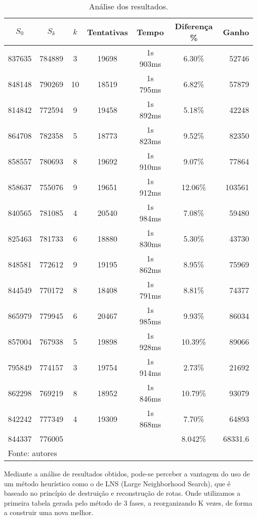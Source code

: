 \documentclass[12pt,a4paper]{article}
\renewcommand*{\arraystretch}{1.2}
\numberwithin{figure}{section}
\numberwithin{table}{section}
\begin{document}
\begin{table}[H]
	\renewcommand{\arraystretch}{1}
	\centering
	\caption{Análise dos resultados.}
	\label{tab:resultados}
	\begin{tabular}{*{6}{c} r}
		\toprule 
		$S_{0}$ & $S_{k}$ & $k$ & Tentativas & Tempo & Diferença \% & Ganho \\ 
		\midrule
		837635 & 784889 &  3 & 19698 & 1s 903ms &  6.30\% &  52746 \\
		848148 & 790269 & 10 & 18519 & 1s 795ms &  6.82\% &  57879 \\
		814842 & 772594 &  9 & 19458 & 1s 892ms &  5.18\% &  42248 \\
		864708 & 782358 &  5 & 18773 & 1s 823ms &  9.52\% &  82350 \\
		858557 & 780693 &  8 & 19692 & 1s 910ms &  9.07\% &  77864 \\
		858637 & 755076 &  9 & 19651 & 1s 912ms & 12.06\% & 103561 \\
		840565 & 781085 &  4 & 20540 & 1s 984ms &  7.08\% &  59480 \\
		825463 & 781733 &  6 & 18880 & 1s 830ms &  5.30\% &  43730 \\
		848581 & 772612 &  9 & 19195 & 1s 862ms &  8.95\% &  75969 \\
		844549 & 770172 &  8 & 18408 & 1s 791ms &  8.81\% &  74377 \\
		865979 & 779945 &  6 & 20467 & 1s 985ms &  9.93\% &  86034 \\
		857004 & 767938 &  5 & 19898 & 1s 928ms & 10.39\% &  89066 \\
		795849 & 774157 &  3 & 19754 & 1s 914ms &  2.73\% &  21692 \\
		862298 & 769219 &  8 & 18952 & 1s 846ms & 10.79\% &  93079 \\
		842242 & 777349 &  4 & 19309 & 1s 868ms &  7.70\% &  64893 \\
		\midrule
		844337 & 776005 &    &       &          &  8.042\% &  68331.6 \\
		\bottomrule
		\multicolumn{6}{l}{\footnotesize Fonte: autores}
	\end{tabular}
\end{table}

Mediante a análise de resultados obtidos, pode-se perceber a vantagem do uso de um método heurístico como o de LNS (Large Neighborhood Search), que é baseado no princípio de destruição e reconstrução de rotas. Onde utilizamos a primeira tabela gerada pelo método de 3 fases, a reorganizando K vezes, de forma a construir uma nova melhor. 
\end{document}
